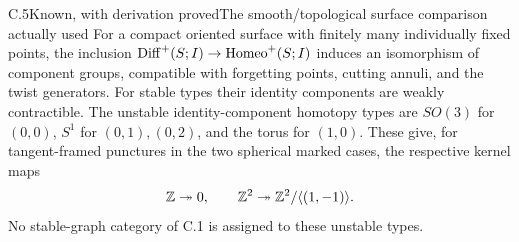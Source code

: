 \begin{result}{C.5}{Known, with derivation proved}{The smooth/topological surface comparison actually used}
For a compact oriented surface with finitely many individually fixed points, the inclusion $\operatorname{Diff}^+(S;I)\to\operatorname{Homeo}^+(S;I)$ induces an isomorphism of component groups, compatible with forgetting points, cutting annuli, and the twist generators. For stable types their identity components are weakly contractible. The unstable identity-component homotopy types are $SO(3)$ for $(0,0)$, $S^1$ for $(0,1),(0,2)$, and the torus for $(1,0)$. These give, for tangent-framed punctures in the two spherical marked cases, the respective kernel maps
\[
 \mathbb Z\twoheadrightarrow0,
 \qquad \mathbb Z^2\twoheadrightarrow\mathbb Z^2/\langle(1,-1)\rangle.
\]
No stable-graph category of C.1 is assigned to these unstable types.
\end{result}
